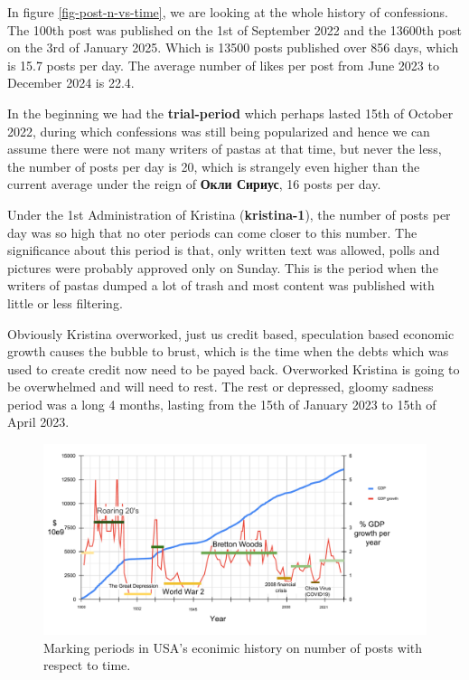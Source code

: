\documentclass[
	12pt
] {article}
\begin{document}
	In figure \ref{fig-post-n-vs-time}, we are looking at the whole history of confessions. The 100th post was published on the 1st of September 2022 and the 13600th post on the 3rd of January 2025. Which is 13500 posts published over 856 days, which is \num{15.7} posts per day. The average number of likes per post from June 2023 to December 2024 is \num{22.4}. 
	
	In the beginning we had the \textbf{trial-period} which perhaps lasted 15th of October 2022, during which confessions was still being popularized and hence we can assume there were not many writers of pastas at that time, but never the less, the number of posts per day is \num{20}, which is strangely even higher than the current average under the reign of \textbf{Окли Сириус}, \num{16} posts per day.
	
	Under the 1st Administration of Kristina (\textbf{kristina-1}), the number of posts per day was so high that no oter periods can come closer to this number. The significance about this period is that, only written text was allowed, polls and pictures were probably approved only on Sunday. This is the period when the writers of pastas dumped a lot of trash and most content was published with little or less filtering.
	
	Obviously Kristina overworked, just us credit based, speculation based economic growth causes the bubble to brust, which is the time when the debts which was used to create credit now need to be payed back. Overworked Kristina is going to be overwhelmed and will need to rest. The rest or depressed, gloomy sadness period was a long 4 months, lasting from the 15th of January 2023 to 15th of April 2023.
	
	\begin{figure}[H]
		\centering
		\includegraphics[width=1\textwidth]{fig-post-n-vs-time-joke}
		\caption{Marking periods in USA's econimic history on number of posts with respect to time.}
		\label{fig-post-n-vs-time-joke}
	\end{figure}
	
\end{document}
